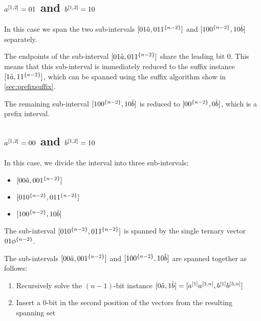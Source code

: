\subsection{\texorpdfstring
{$a^{[1, 2]} = 01$ and $b^{[1, 2]} = 10$}
{ = 01 and  = 10}
}
\label{sec:1interval0110}

In this case
we span the two sub-intervals
$[01 \hat{a}, 01 1^{\{n-2\}}]$
and
$[10 0^{\{n-2\}}, 10 \hat{b}]$
separately.

The endpoints of the sub-interval
$[01 \hat{a}, 01 1^{\{n-2\}}]$
share the leading bit $0$.
This means that this sub-interval is immediately
reduced to the suffix instance
$[1 \hat{a}, 1 1^{\{n-2\}}]$,
which can be spanned using the suffix algorithm
show in \cref{sec:prefixsuffix}.

The remaining sub-interval
$[10 0^{\{n-2\}}, 10 \hat{b}]$
is reduced to
$[0 0^{\{n-2\}}, 0 \hat{b}]$,
which is a prefix interval.

\subsection{\texorpdfstring
{$a^{[1, 2]} = 00$ and $b^{[1, 2]} = 10$}
{ = 00 and  = 10}
}
\label{sec:0010}

In this case,
we divide the interval into three sub-intervals:

\begin{itemize}
\item $[00 \hat{a}, 00 1^{\{n-2\}}]$
\item $[01 0^{\{n-2\}}, 01 1^{\{n-2\}}]$
\item $[10 0^{\{n-2\}}, 10 \hat{b}]$
\end{itemize}

The sub-interval
$[01 0^{\{n-2\}}, 01 1^{\{n-2\}}]$
is spanned by the single ternary vector
$01 \phi^{\{n-2\}}$.

The sub-intervals
$[00 \hat{a}, 00 1^{\{n-2\}}]$
and
$[10 0^{\{n-2\}}, 10 \hat{b}]$
are spanned together as follows:

\begin{enumerate}
\item Recursively solve the $(n-1)$-bit instance
$[0 \hat{a}, 1 \hat{b}]
= [a^{[1]} a^{[3, n]}, b^{[1]} b^{[3, n]}]$
\item Insert a $0$-bit in the second position
of the vectors from the resulting spanning set
\end{enumerate}

